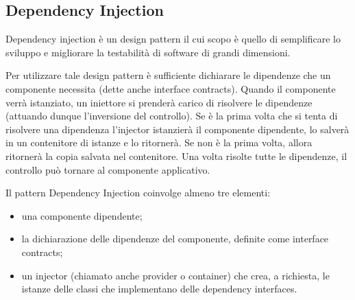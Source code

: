 \subsection{Dependency Injection}
Dependency injection è un design pattern il cui scopo è quello di semplificare lo sviluppo e migliorare la testabilità di software di grandi dimensioni.

Per utilizzare tale design pattern è sufficiente dichiarare le dipendenze che un componente necessita (dette anche interface contracts).
Quando il componente verrà istanziato, un iniettore si prenderà carico di risolvere le dipendenze (attuando dunque l'inversione del controllo).
Se è la prima volta che si tenta di risolvere una dipendenza l'injector istanzierà il componente dipendente, lo salverà in un contenitore di istanze e lo ritornerà.
Se non è la prima volta, allora ritornerà la copia salvata nel contenitore.
Una volta risolte tutte le dipendenze, il controllo può tornare al componente applicativo.

Il pattern Dependency Injection coinvolge almeno tre elementi:
\begin{itemize}
\item una componente dipendente;
\item la dichiarazione delle dipendenze del componente, definite come interface contracts;
\item un injector (chiamato anche provider o container) che crea, a richiesta, le istanze delle classi che implementano delle dependency interfaces.
\end{itemize}

